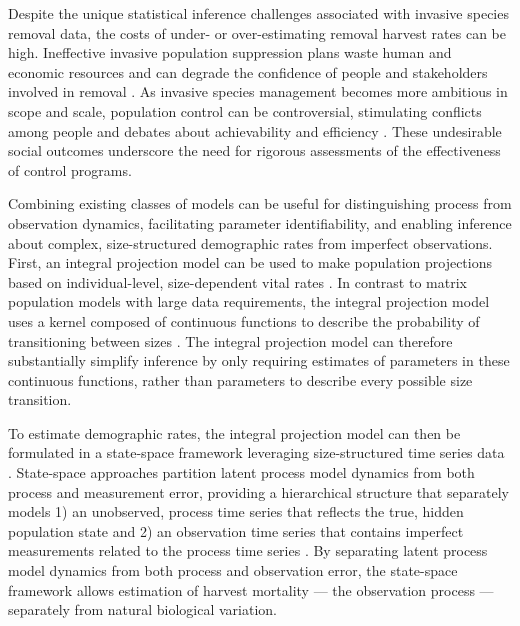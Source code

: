 \documentclass{article}
\begin{document}
Despite the unique statistical inference challenges associated with invasive species removal data, the costs of under- or over-estimating removal harvest rates can be high. Ineffective invasive population suppression plans waste human and economic resources and can degrade the confidence of people and stakeholders involved in removal \parencite{tiberti2021alien}. As invasive species management becomes more ambitious in scope and scale, population control can be controversial, stimulating conflicts among people and debates about achievability and efficiency \parencite{crowley2017conflict}. These undesirable social outcomes underscore the need for rigorous assessments of the effectiveness of control programs.

Combining existing classes of models can be useful for distinguishing process from observation dynamics, facilitating parameter identifiability, and enabling inference about complex, size-structured demographic rates from imperfect observations. First, an integral projection model can be used to make population projections based on individual-level, size-dependent vital rates \parencite{merow2014advancing, rees2014building}. In contrast to matrix population models with large data requirements, the integral projection model uses a kernel composed of continuous functions to describe the probability of transitioning between sizes \parencite{ellner2006integral}. The integral projection model can therefore substantially simplify inference by only requiring estimates of parameters in these continuous functions, rather than parameters to describe every possible size transition. 

To estimate demographic rates, the integral projection model can then be formulated in a state-space framework leveraging size-structured time series data \parencite{white2016fitting}. State-space approaches partition latent process model dynamics from both process and measurement error, providing a hierarchical structure that separately models 1) an unobserved, process time series that reflects the true, hidden population state and 2) an observation time series that contains imperfect measurements related to the process time series \parencite{auger2021guide}. By separating latent process model dynamics from both process and observation error, the state-space framework allows estimation of harvest mortality — the observation process — separately from natural biological variation.
\end{document}
